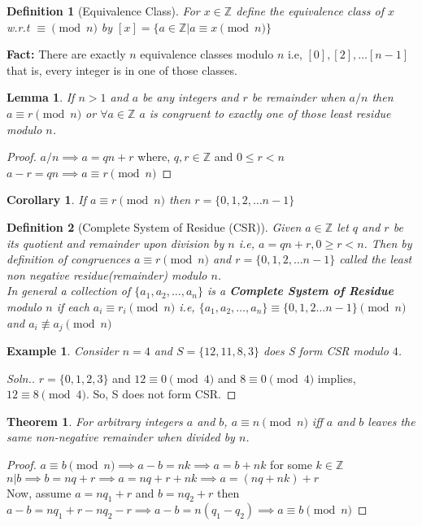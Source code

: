 \documentclass[12pt,a4paper]{article}
\newcommand{\Z}{\mathbb{Z}}
\newtheorem{thm}{Theorem}
\newtheorem{defn}{Definition}
\newtheorem{lem}{Lemma}
\newtheorem{cor}{Corollary}
\newtheorem{ex}{Example}
\begin{document}
\begin{defn}[Equivalence Class]
	For $x \in \Z$ define the equivalence class of $x$ w.r.t $\equiv \pmod n$ by $[x]=\{a\in \Z | a\equiv x \pmod n \}$
\end{defn}
\textbf{Fact:} There are exactly $n$ equivalence classes modulo $n$ i.e, $[0],[2],\dots [n-1]$ that is, every integer is in one of those classes.
\begin{lem}	
	If $n>1$ and $a$ be any integers and $r$ be remainder when $a/n$ then $a \equiv r \pmod n$ or $\forall a \in \Z$ $a$ is congruent to exactly one of those least residue modulo $n$.
\end{lem}
\begin{proof}
	$a/n \implies a=qn+r$ where, $ q,r \in \Z $ and $0\le r < n$ \\
	$a-r = qn \implies a \equiv r \pmod n$
\end{proof}

\begin{cor}
	If $a \equiv r \pmod n$ then $r = \{0,1,2,\dots n-1\}$
\end{cor}

\begin{defn}[Complete System of Residue (CSR)]
	Given $a \in \Z$ let $q$ and $r$ be its quotient and remainder upon division by $n$ i.e, $a = qn+r, 0 \ge r < n$. Then by definition of congruences $a \equiv r \pmod n$ and $r = \{0,1,2,\dots n-1\}$ called the least non negative residue(remainder) modulo $n$. \\
	In general a collection of $\{a_{1}, a_{2}, \dots, a_{n}\}$ is a \textbf{Complete System of Residue} modulo $n$ if each $a_{i} \equiv r_{i} \pmod n$ i.e, $\{a_{1}, a_{2}, \dots, a_{n}\} \equiv \{0,1,2 \dots n-1\} \pmod n$ and $a_{i} \not \equiv a_{j} \pmod n$
\end{defn}

\begin{ex}
	Consider $n=4$ and $S = \{12,11,8,3\}$ does S form CSR modulo $4$.
\end{ex}
\begin{proof}[Soln.]
	$r = \{0,1,2,3\}$ and $12 \equiv 0 \pmod 4$ and $8 \equiv 0 \pmod 4$ implies, $12 \equiv 8 \pmod 4$. So, S does not form CSR.
\end{proof}

\begin{thm}
	For arbitrary integers $a$ and $b$, $a \equiv n \pmod n$ iff $a$ and $b$ leaves the same non-negative remainder when divided by $n$. 
\end{thm}
\begin{proof}
	$ a \equiv b \pmod n \implies a - b = nk \implies a = b + nk$ for some $k \in \Z$\\
	$n|b \implies b = nq + r \implies a = nq+r+nk \implies a = (nq+nk)+r$\\
	Now, assume $a=nq_{1}+r$ and $b=nq_{2}+r$ then $a-b=nq_{1}+r - nq_{2}-r \implies a-b = n(q_{1}-q_{2}) \implies a\equiv b \pmod n$
\end{proof}
\end{document}
